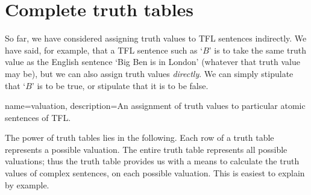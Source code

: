 \chapter{Complete truth tables}\label{s:CompleteTruthTables}
So far, we have considered assigning truth values to TFL sentences indirectly. We have said, for example, that a TFL sentence such as `$B$' is to take the same truth value as the English sentence `Big Ben is in London' (whatever that truth value may be), but we can also assign truth values \emph{directly}. We can simply stipulate that `$B$' is to be true, or stipulate that it is to be false.

{
name=valuation,
description={An assignment of truth values to particular atomic sentences of TFL.}
}

The power of truth tables lies in the following. Each row of a truth table represents a possible valuation. The entire truth table represents all possible valuations; thus the truth table provides us with a means to calculate the truth values of complex sentences, on each possible valuation. This is easiest to explain by example.


